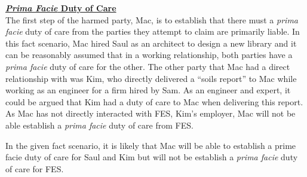 \documentclass[12pt,letterpaper]{article}
\begin{document}
\par
\textbf{\underline{\textit{Prima Facie} Duty of Care}}\\
\indent
The first step of the harmed party, Mac, is to establish that there must a \textit{prima facie} duty of care from the parties they attempt to claim are primarily liable. In this fact scenario, Mac hired Saul as an architect to design a new library and it can be reasonably assumed that in a working relationship, both parties have a \textit{prima facie} duty of care for the other. The other party that Mac had a direct relationship with was Kim, who directly delivered a “soils report” to Mac while working as an engineer for a firm hired by Sam. As an engineer and expert, it could be argued that Kim had a duty of care to Mac when delivering this report. As Mac has not directly interacted with FES, Kim's employer, Mac will not be able establish a \textit{prima facie} duty of care from FES.\par
In the given fact scenario, it is likely that Mac will be able to establish a prime facie duty of care for Saul and Kim but will not be establish a \textit{prima facie} duty of care for FES.
\end{document}
